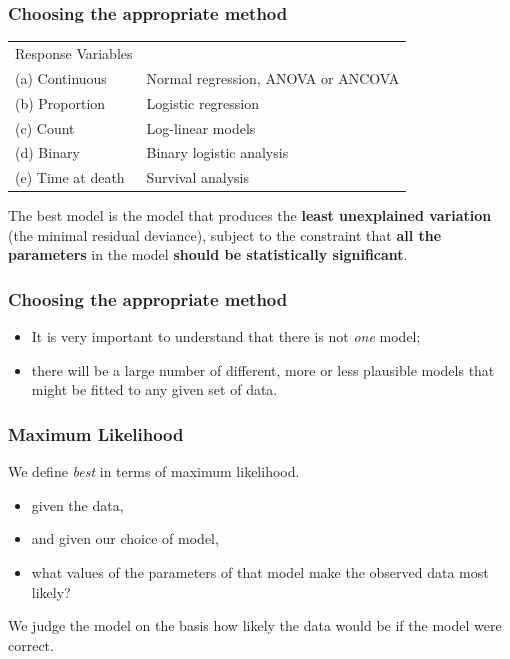 \begin{frame}\frametitle{Choosing the appropriate method}
\begin{center}
  \begin{tabular}{@{} >{\ttfamily}l l} 
    \rowcolor{gray!40}
Response Variables & \\
(a) Continuous   & Normal regression, ANOVA or ANCOVA\\
(b) Proportion   & Logistic regression               \\
(c) Count        & Log-linear models                 \\
(d) Binary       & Binary logistic analysis          \\
(e) Time at death& Survival analysis                 \\
  \end{tabular}
\end{center}
The best model is the model that produces the \textbf{least unexplained variation} (the minimal residual
deviance), subject to the constraint that \textbf{all the parameters} in the model \textbf{should be statistically
significant}.
\end{frame}

\begin{frame}\frametitle{Choosing the appropriate method}
  \begin{itemize}
  \item It is very important to understand that there is not \emph{one} model;
  \item there will be a large number of different, more or less plausible models that   might be fitted to any given set of data. 
  \end{itemize}
\end{frame}

\begin{frame}\frametitle{Maximum Likelihood}
We define \emph{best} in terms of maximum likelihood.
\begin{itemize}
\item given the data,                                                                
\item and given our choice of model,                                                 
\item what values of the parameters of that model make the observed data most likely?
\end{itemize}
We judge the model on the basis how likely the data would be if the model were correct. 
\end{frame}

